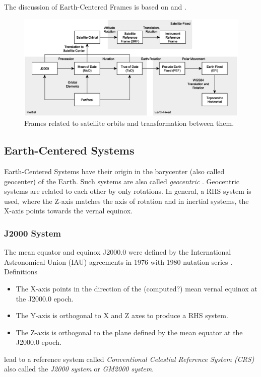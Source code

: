 \documentclass [12pt, a4paper] {article}
\begin{document}
The discussion of Earth-Centered Frames is based on \cite{gnss} and \cite{aiaa_frames}.
\begin {figure}
  \begin {center}
     \includegraphics [angle=0, width=1.0\columnwidth] {figures/coordinates.eps}
     \caption{\label{fig:coordinates} Frames related to satellite orbits and transformation between 
     them.}
  \end {center}
\end {figure} 


\subsection{Earth-Centered Systems}
Earth-Centered Systems have their origin in the barycenter (also called geocenter) of
the Earth. Such systems are also called \emph{geocentric} \cite{gnss}.
Geocentric systems are related to each other by only rotations. 
In general, a RHS system is used, where the Z-axis matches the axis of rotation and in 
inertial systems, the X-axis points towards the vernal equinox.

\subsubsection{J2000 System}
The mean equator and equinox J2000.0 were defined by the International Astronomical Union 
(IAU) agreements in 1976 with 1980 nutation series \cite{GNSS}. Definitions
\begin {itemize}
  \item The X-axis points in the direction of the (computed?) mean vernal equinox at the 
  J2000.0 epoch.
  \item The Y-axis is orthogonal to X and Z axes to produce a RHS system.
  \item The Z-axis is orthogonal to the plane defined by the mean equator at the 
  J2000.0 epoch.
\end {itemize}
lead to a reference system called 
\emph{Conventional Celestial Reference System (CRS)}
also called the \emph{J2000 system} or \emph{GM2000 system}. 
\end{document}
